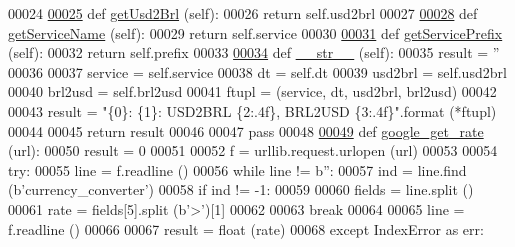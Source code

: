\begin{DoxyCode}
00024     
\hypertarget{rates_8py_source.tex_l00025}{}\hyperlink{namespacerates_ae4c7203ef8a919f9cf522581ca00b08a}{00025}     \textcolor{keyword}{def }\hyperlink{namespacerates_ae4c7203ef8a919f9cf522581ca00b08a}{getUsd2Brl} (self):
00026         \textcolor{keywordflow}{return} self.usd2brl
00027     
\hypertarget{rates_8py_source.tex_l00028}{}\hyperlink{namespacerates_a5dd7b6601bc66e313c26984e32f1e290}{00028}     \textcolor{keyword}{def }\hyperlink{namespacerates_a5dd7b6601bc66e313c26984e32f1e290}{getServiceName} (self):
00029         \textcolor{keywordflow}{return} self.service
00030     
\hypertarget{rates_8py_source.tex_l00031}{}\hyperlink{namespacerates_aafc179b32863137b88c74dd0ee2576bd}{00031}     \textcolor{keyword}{def }\hyperlink{namespacerates_aafc179b32863137b88c74dd0ee2576bd}{getServicePrefix} (self):
00032         \textcolor{keywordflow}{return} self.prefix
00033         
\hypertarget{rates_8py_source.tex_l00034}{}\hyperlink{namespacerates_a2f1a70c33ee9e255938e4c19fd207264}{00034}     \textcolor{keyword}{def }\hyperlink{namespacerates_a2f1a70c33ee9e255938e4c19fd207264}{\_\_str\_\_} (self):
00035         result = \textcolor{stringliteral}{''}
00036 
00037         service = self.service
00038         dt      = self.dt
00039         usd2brl = self.usd2brl
00040         brl2usd = self.brl2usd
00041         ftupl = (service, dt, usd2brl, brl2usd)
00042         
00043         result = \textcolor{stringliteral}{"\{0\}: \{1\}: USD2BRL \{2:.4f\}, BRL2USD \{3:.4f\}"}.format (*ftupl)
00044 
00045         \textcolor{keywordflow}{return} result        
00046     
00047     \textcolor{keywordflow}{pass} 
00048 
\hypertarget{rates_8py_source.tex_l00049}{}\hyperlink{namespacerates_a2819015de60b5745e06ed3d266d26d6b}{00049} \textcolor{keyword}{def }\hyperlink{namespacerates_a2819015de60b5745e06ed3d266d26d6b}{google\_get\_rate} (url):
00050     result = 0
00051 
00052     f = urllib.request.urlopen (url)
00053     
00054     \textcolor{keywordflow}{try}:
00055         line = f.readline ()
00056         \textcolor{keywordflow}{while} line != b\textcolor{stringliteral}{''}:
00057             ind = line.find (b\textcolor{stringliteral}{'currency\_converter'})
00058             \textcolor{keywordflow}{if} ind != -1:
00059                 
00060                 fields = line.split ()
00061                 rate = fields[5].split (b\textcolor{stringliteral}{'>'})[1]
00062                 
00063                 \textcolor{keywordflow}{break}
00064                 
00065             line = f.readline ()
00066         
00067         result = float (rate)
00068     \textcolor{keywordflow}{except} IndexError \textcolor{keyword}{as} err:

\end{DoxyCode}
